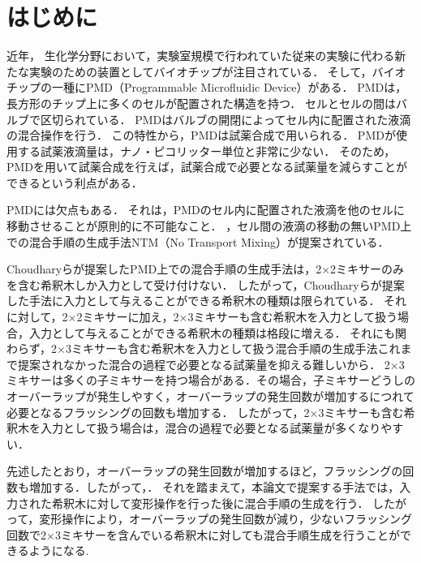 \chapter{はじめに}
近年， 生化学分野において，実験室規模で行われていた従来の実験に代わる新たな実験のための装置としてバイオチップが注目されている．
そして，バイオチップの一種にPMD（Programmable Microfluidic Device）がある\cite{PMDDescription}．
PMDは，長方形のチップ上に多くのセルが配置された構造を持つ．
セルとセルの間はバルブで区切られている．
PMDはバルブの開閉によってセル内に配置された液滴の混合操作を行う．
この特性から，PMDは試薬合成で用いられる\cite{C0LC00537A}．
PMDが使用する試薬液滴量は，ナノ・ピコリッター単位と非常に少ない．
そのため，PMDを用いて試薬合成を行えば，試薬合成で必要となる試薬量を減らすことができるという利点がある\cite{PMDDescription}．

PMDには欠点もある．
それは，PMDのセル内に配置された液滴を他のセルに移動させることが原則的に不可能なこと\cite{9116370}．
，セル間の液滴の移動{の無いPMD上での混合手順の生成手法}NTM（No Transport Mixing）が提案されている\cite{9116370}．

Choudharyらが提案したPMD上での混合手順の生成手法は，2×2ミキサーのみを含む希釈木しか入力として受け付けない．
したがって，Choudharyらが提案した手法に入力として与えることができる希釈木の種類は限られている．
それに対して，2×2ミキサーに加え，2×3ミキサーも含む希釈木を入力として扱う場合，入力として与えることができる希釈木の種類は格段に増える．
それにも関わらず，2×3ミキサーも含む希釈木を入力として扱う混合手順の生成手法これまで提案されなかった混合の過程で必要となる試薬量を抑える難しいから．
2×3ミキサーは多くの子ミキサーを持つ場合がある．その場合，子ミキサーどうしのオーバーラップが発生しやすく，オーバーラップの発生回数が増加するにつれて必要となるフラッシングの回数も増加する．
したがって，2×3ミキサーも含む希釈木を入力として扱う場合は，混合の過程で必要となる試薬量が多くなりやすい．

先述したとおり，オーバーラップの発生回数が増加するほど，フラッシングの回数も増加する．したがって，．
それを踏まえて，本論文で提案する手法では，入力された希釈木に対して変形操作を行った後に混合手順の生成を行う．
したがって，変形操作により，オーバーラップの発生回数が減り，少ないフラッシング回数で2×3ミキサーを含んでいる希釈木に対しても混合手順生成を行うことができるようになる.

